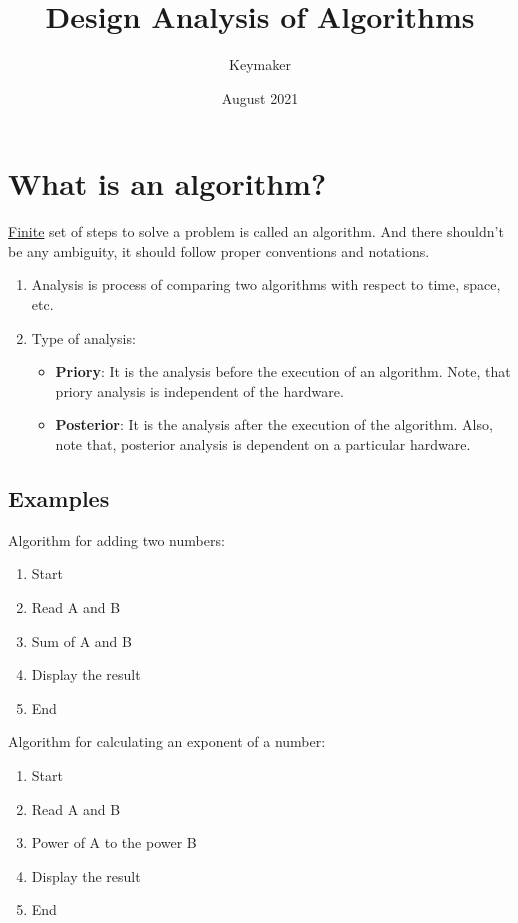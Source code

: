 \documentclass[a4paper,12pt]{article}
\title{\textbf{Design Analysis of Algorithms}}
\author{Keymaker}
\date{August 2021}
\theoremstyle{definition}
\begin{document}
    \maketitle


    \section{What is an algorithm?}

    \underline{Finite} set of steps to solve a problem is called an algorithm. And there shouldn't be any ambiguity, it should follow proper conventions and notations.

    \begin{enumerate}
        \item Analysis is process of comparing two algorithms with respect to time, space, etc.
        \item Type of analysis:
        \begin{itemize}
            \item \textbf{Priory}: It is the analysis before the execution of an algorithm. Note, that priory analysis is independent of the hardware.
            \item \textbf{Posterior}: It is the analysis after the execution of the algorithm. Also, note that, posterior analysis is dependent on a particular hardware.
        \end{itemize}
    \end{enumerate}

    \subsection{Examples}

    \noindent Algorithm for adding two numbers:
    \begin{enumerate}
        \itemsep 0mm
        \item Start
        \item Read A and B
        \item Sum of A and B
        \item Display the result
        \item End
    \end{enumerate}

    \noindent Algorithm for calculating an exponent of a number:
    \begin{enumerate}
        \itemsep 0mm
        \item Start
        \item Read A and B
        \item Power of A to the power B
        \item Display the result
        \item End
    \end{enumerate}
\end{document}
